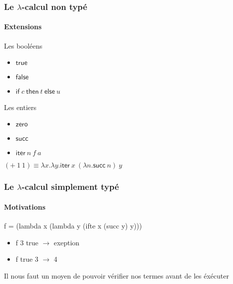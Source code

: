 \documentclass{beamer}
\newcommand{\Lam}[2]{\ensuremath{\lambda #1. #2}}
\newcommand{\ifte}[4][]{\ensuremath{\mathsf{if}_{#1}\: #2\: \mathsf{then}\: #3\: \mathsf{else}\: #4}}
\newcommand{\true}{\ensuremath{\mathsf{true}}}
\newcommand{\false}{\ensuremath{\mathsf{false}}}
\newcommand{\zero}{\ensuremath{\mathsf{zero}}}
\newcommand{\succs}{\ensuremath{\mathsf{succ}}}
\newcommand{\iter}{\ensuremath{\mathsf{iter}}}
\begin{document}
\begin{frame}
\frametitle{Le $\lambda$-calcul non typé}
\framesubtitle{Extensions}

\begin{block}{Les booléens}
  \begin{itemize}
  \item $\true$ 
  \item $\false$
  \item $\ifte{c}{t}{u}$
  \end{itemize}
\end{block}

\begin{block}{Les entiers}
  \begin{itemize}
  \item $\zero$ 
  \item $\succs$ 
  \item $\iter\:n\:f\:a$ 
  \end{itemize}
  $(+\:1\:1) \equiv \Lam{x}{\Lam{y}{\iter\: x\:(\Lam{n}{\succs\:n})\:y  }}$
\end{block}  
\end{frame}
\begin{frame}
\frametitle{Le $\lambda$-calcul simplement typé}
\framesubtitle{Motivations} 

\begin{block}{}
  f = (lambda x (lambda y (ifte x (succ y) y)))
  \begin{itemize}
  \item f 3 true $\rightarrow$ exeption
  \item f true 3 $\rightarrow$ 4  
  \end{itemize}
\end{block}

\begin{block}{}
  Il nous faut un moyen de pouvoir vérifier nos termes avant de les éxécuter
\end{block}



\end{frame}
\end{document}
